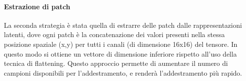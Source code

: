 \paragraph{Estrazione di patch} La seconda strategia è stata quella di estrarre delle patch dalle rappresentazioni latenti, dove ogni patch è la concatenazione dei valori presenti nella stessa posizione spaziale (x,y) per tutti i canali (di dimensione 16x16) del tensore. In questo modo si ottiene un vettore di dimensione inferiore rispetto all'uso della tecnica di flattening. Questo approccio permette di aumentare il numero di campioni disponibili per l'addestramento, e renderà l'addestramento più rapido.
